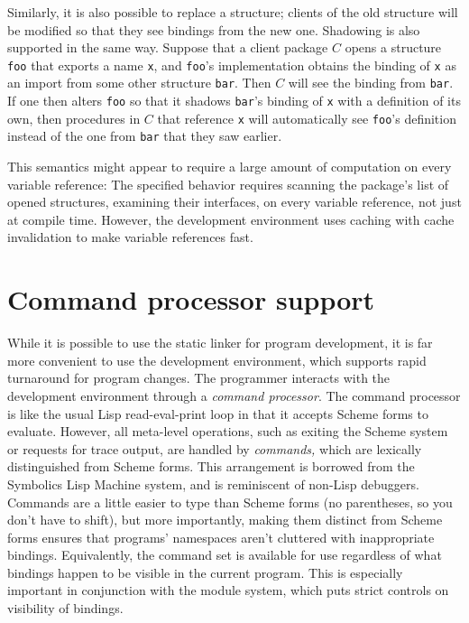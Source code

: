 Similarly, it is also possible to replace a structure; clients of the
old structure will be modified so that they see bindings from the new
one.  Shadowing is also supported in the same way.  Suppose that a
client package $C$ opens a structure {\tt foo} that exports a name
{\tt x}, and {\tt foo}'s implementation obtains the binding of {\tt x}
as an import from some other structure {\tt bar}.  Then $C$ will see
the binding from {\tt bar}.  If one then alters {\tt foo} so that it
shadows {\tt bar}'s binding of {\tt x} with a definition of its own,
then procedures in $C$ that reference {\tt x} will automatically see
{\tt foo}'s definition instead of the one from {\tt bar} that they saw
earlier.

This semantics might appear to require a large amount of computation
on every variable reference: The specified behavior requires scanning
the package's list of opened structures, examining their interfaces,
on every variable reference, not just at compile time.  However, the
development environment uses caching with cache invalidation to make
variable references fast.


\section{Command processor support}
\label{module-commands}

While it is possible to use the \hack{} static linker for program
development, it is far more convenient to use the development
environment, which supports rapid turnaround for program changes.  The
programmer interacts with the development environment through a {\em
command processor}.  The command processor is like the usual Lisp
read-eval-print loop in that it accepts Scheme forms to evaluate.
However, all meta-level operations, such as exiting the Scheme system
or requests for trace output, are handled by {\em commands,} which are
lexically distinguished from Scheme forms.  This arrangement is
borrowed from the Symbolics Lisp Machine system, and is reminiscent of
non-Lisp debuggers.  Commands are a little easier to type than Scheme
forms (no parentheses, so you don't have to shift), but more
importantly, making them distinct from Scheme forms ensures that
programs' namespaces aren't cluttered with inappropriate bindings.
Equivalently, the command set is available for use regardless of what
bindings happen to be visible in the current program.  This is
especially important in conjunction with the module system, which puts
strict controls on visibility of bindings.

